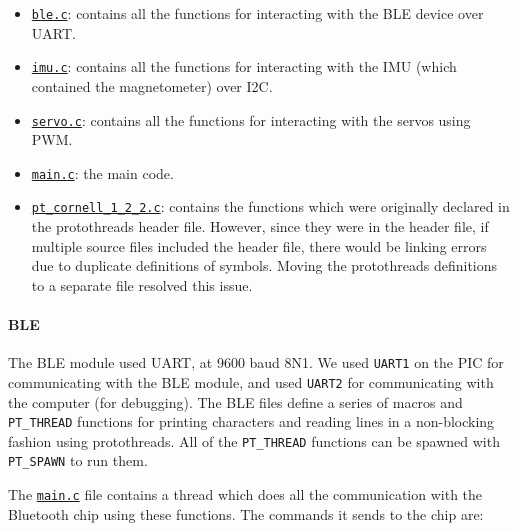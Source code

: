 \documentclass[]{article}
\providecommand{\tightlist}{%
  \setlength{\itemsep}{0pt}\setlength{\parskip}{0pt}}
\let\oldparagraph\paragraph
\renewcommand{\paragraph}[1]{\oldparagraph{#1}\mbox{}}
\begin{document}
\begin{itemize}
\tightlist
\item
  \href{generated/ble.c.html}{\texttt{ble.c}}: contains all the
  functions for interacting with the BLE device over UART.
\item
  \href{generated/imu.c.html}{\texttt{imu.c}}: contains all the
  functions for interacting with the IMU (which contained the
  magnetometer) over I2C.
\item
  \href{generated/servo.c.html}{\texttt{servo.c}}: contains all the
  functions for interacting with the servos using PWM.
\item
  \href{generated/main.c.html}{\texttt{main.c}}: the main code.
\item
  \href{generated/pt_cornell_1_2_2.c.html}{\texttt{pt\_cornell\_1\_2\_2.c}}:
  contains the functions which were originally declared in the
  protothreads header file. However, since they were in the header file,
  if multiple source files included the header file, there would be
  linking errors due to duplicate definitions of symbols. Moving the
  protothreads definitions to a separate file resolved this issue.
\end{itemize}

\hypertarget{ble}{%
\paragraph{BLE}\label{ble}}

The BLE module used UART, at 9600 baud 8N1. We used \texttt{UART1} on
the PIC for communicating with the BLE module, and used \texttt{UART2}
for communicating with the computer (for debugging). The BLE files
define a series of macros and \texttt{PT\_THREAD} functions for printing
characters and reading lines in a non-blocking fashion using
protothreads. All of the \texttt{PT\_THREAD} functions can be spawned
with \texttt{PT\_SPAWN} to run them.

The \href{generated/main.c.html}{\texttt{main.c}} file contains a thread
which does all the communication with the Bluetooth chip using these
functions. The commands it sends to the chip are:
\end{document}
